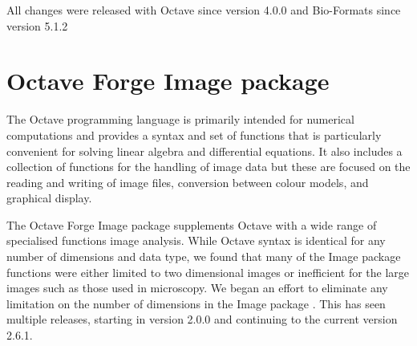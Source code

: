 All changes were released with Octave since version 4.0.0 and
Bio-Formats since version 5.1.2

\section{Octave Forge Image package}

The Octave programming language is primarily intended for numerical
computations and provides a syntax and set of functions that is particularly
convenient for solving linear algebra and differential equations.  It
also includes a collection of functions for the handling of image data
but these are focused on the reading and writing of image files,
conversion between colour models, and graphical display.

The Octave Forge Image package supplements Octave with a wide range of
specialised functions image analysis.  While Octave syntax is
identical for any number of dimensions and data type, we found that
many of the Image package functions were either limited to two
dimensional images or inefficient for the large images such as those used in
microscopy.  We began an effort to eliminate any
limitation on the number of dimensions in the Image package
.  This has seen multiple
releases, starting in version 2.0.0 and continuing to the current
version 2.6.1.

